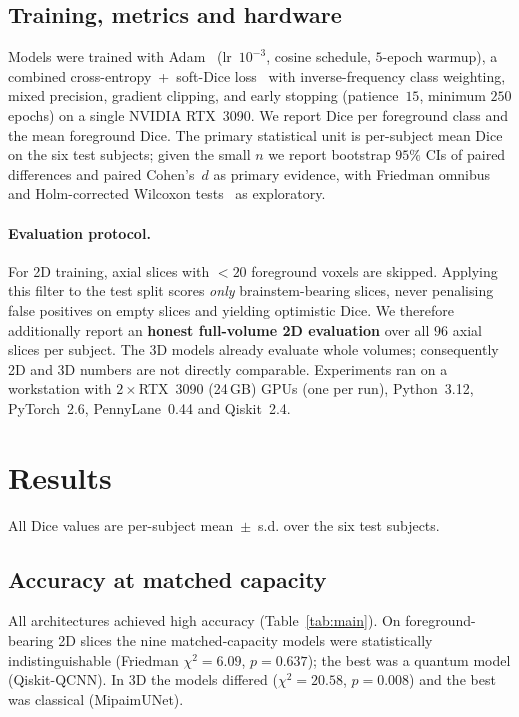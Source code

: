 \documentclass[runningheads]{llncs}
\begin{document}
\subsection{Training, metrics and hardware}
Models were trained with Adam~\cite{adam} (lr~$10^{-3}$, cosine schedule,
$5$-epoch warmup), a combined cross-entropy~+~soft-Dice loss~\cite{vnet} with
inverse-frequency class weighting, mixed precision, gradient clipping, and
early stopping (patience~$15$, minimum $250$ epochs) on a single NVIDIA
RTX~3090. We report Dice per foreground class and the mean foreground Dice.
The primary statistical unit is per-subject mean Dice on the six test subjects;
given the small $n$ we report bootstrap $95\%$ CIs of paired differences and
paired Cohen's~$d$ as primary evidence, with Friedman omnibus and
Holm-corrected Wilcoxon tests~\cite{nonparam} as exploratory.

\paragraph{Evaluation protocol.} For 2D training, axial slices with $<20$
foreground voxels are skipped. Applying this filter to the test split scores
\emph{only} brainstem-bearing slices, never penalising false positives on empty
slices and yielding optimistic Dice. We therefore additionally report an
\textbf{honest full-volume 2D evaluation} over all $96$ axial slices per
subject. The 3D models already evaluate whole volumes; consequently 2D and 3D
numbers are not directly comparable. Experiments ran on a workstation with
$2{\times}$RTX~3090 (24\,GB) GPUs (one per run), Python~3.12, PyTorch~2.6,
PennyLane~0.44 and Qiskit~2.4.

\section{Results}
All Dice values are per-subject mean~$\pm$~s.d. over the six test subjects.

\subsection{Accuracy at matched capacity}
All architectures achieved high accuracy (Table~\ref{tab:main}). On
foreground-bearing 2D slices the nine matched-capacity models were
statistically indistinguishable (Friedman $\chi^2{=}6.09$, $p{=}0.637$); the
best was a quantum model (Qiskit-QCNN). In 3D the models differed
($\chi^2{=}20.58$, $p{=}0.008$) and the best was classical (MipaimUNet).
\end{document}
